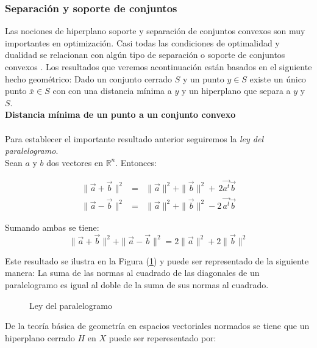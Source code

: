 \subsubsection{Separaci\'on y soporte de conjuntos}
\medskip

Las nociones de hiperplano soporte y separaci\'on de conjuntos convexos son muy importantes en optimizaci\'on. Casi todas las condiciones de
optimalidad y dualidad se relacionan con alg\'un tipo de separaci\'on o soporte de conjuntos convexos \cite{no-lineal}. Los resultados que veremos 
acontinuaci\'on est\'an basados en el siguiente hecho geom\'etrico: Dado un conjunto cerrado $S$  y un punto $y \in S$ existe un \'unico punto
$\overline{x} \in S$ con con una distancia m\'inima a $y$ y un hiperplano que separa a $y$ y $S$.\\

\textbf{Distancia m\'inima de un punto a un conjunto convexo \cite{no-lineal}}\\
\\

Para establecer el importante resultado anterior seguiremos la {\it ley del paralelogramo}.\\
Sean $a$ y $b$ dos vectores en $\mathbb{R}^n.$ Entonces: 

\begin{eqnarray*}
   \parallel \vec{a} + \vec{b} \parallel ^2 &=& \parallel \vec{a} \parallel ^2 + \parallel \vec{b} \parallel ^2 + \,2 \vec{a^t} \vec{b} \\
   \parallel \vec{a} - \vec{b} \parallel ^2 &=& \parallel \vec{a} \parallel ^2 + \parallel \vec{b} \parallel ^2 - 2 \, \vec{a^t} \vec{b}
\end{eqnarray*}

Sumando ambas se tiene:
 \[\parallel \vec{a} + \vec{b} \parallel ^2 + \parallel \vec{a} - \vec{b} \parallel ^2 = 
2 \parallel \vec{a} \parallel ^2 + 2 \parallel \vec{b} \parallel ^2\]

Este resultado se ilustra en la Figura (\ref{paralelogramo}) y puede ser representado de la siguiente manera:
La suma de las normas al cuadrado de las diagonales de un paralelogramo es igual al doble de la suma de sus normas al cuadrado.

\begin{figure}   \centering
   
   \caption{Ley del paralelogramo}\label{paralelogramo}
\end{figure} 

De la teor\'ia b\'asica de geometr\'ia en espacios vectoriales normados se tiene que un hiperplano cerrado $H$ en $X$ puede ser reperesentado
por: \cite{pajardo}


